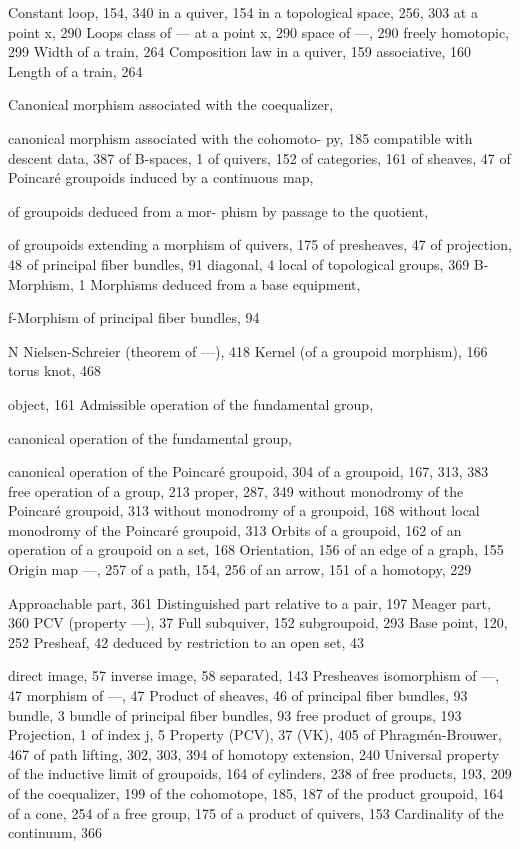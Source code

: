 
Constant loop, 154, 340 in a quiver, 154 in a topological space, 256, 303 at a point x, 290 Loops class of --- at a point x, 290 space of ---, 290 freely homotopic, 299 Width of a train, 264 Composition law in a quiver, 159 associative, 160 Length of a train, 264


Canonical morphism associated with the coequalizer,

canonical morphism associated with the cohomoto- py, 185 compatible with descent data, 387 of B-spaces, 1 of quivers, 152 of categories, 161 of sheaves, 47 of Poincaré groupoids induced by a continuous map,

of groupoids deduced from a mor- phism by passage to the quotient,

of groupoids extending a morphism of quivers, 175 of presheaves, 47 of projection, 48 of principal fiber bundles, 91 diagonal, 4 local of topological groups, 369 B-Morphism, 1 Morphisms deduced from a base equipment,

f-Morphism of principal fiber bundles, 94

N Nielsen-Schreier (theorem of ---), 418 Kernel (of a groupoid morphism), 166 torus knot, 468


object, 161 Admissible operation of the fundamental group,

canonical operation of the fundamental group,

canonical operation of the Poincaré groupoid, 304 of a groupoid, 167, 313, 383 free operation of a group, 213 proper, 287, 349 without monodromy of the Poincaré groupoid, 313 without monodromy of a groupoid, 168 without local monodromy of the Poincaré groupoid, 313 Orbits of a groupoid, 162 of an operation of a groupoid on a set, 168 Orientation, 156 of an edge of a graph, 155 Origin map ---, 257 of a path, 154, 256 of an arrow, 151 of a homotopy, 229


Approachable part, 361 Distinguished part relative to a pair, 197 Meager part, 360 PCV (property ---), 37 Full subquiver, 152 subgroupoid, 293 Base point, 120, 252 Presheaf, 42 deduced by restriction to an open set, 43

direct image, 57 inverse image, 58 separated, 143 Presheaves isomorphism of ---, 47 morphism of ---, 47 Product of sheaves, 46 of principal fiber bundles, 93 bundle, 3 bundle of principal fiber bundles, 93 free product of groups, 193 Projection, 1 of index j, 5 Property (PCV), 37 (VK), 405 of Phragmén-Brouwer, 467 of path lifting, 302, 303, 394 of homotopy extension, 240 Universal property of the inductive limit of groupoids, 164 of cylinders, 238 of free products, 193, 209 of the coequalizer, 199 of the cohomotope, 185, 187 of the product groupoid, 164 of a cone, 254 of a free group, 175 of a product of quivers, 153 Cardinality of the continuum, 366

